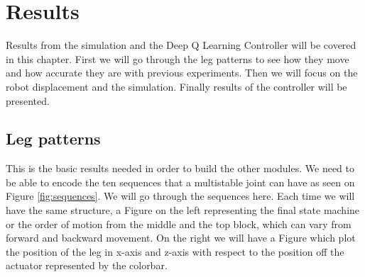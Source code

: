 \chapter{Results}
    Results from the simulation and the Deep Q Learning Controller will be covered in this chapter. First we will go through the leg patterns to see how they move and how accurate they are with previous experiments. Then we will focus on the robot displacement and the simulation. Finally results of the controller will be presented.
    
    \section{Leg patterns}\label{sec:res_legs}
        This is the basic results needed in order to build the other modules. We need to be able to encode the ten sequences that a multistable joint can have as seen on Figure \ref{fig:sequences}. We will go through the sequences here. Each time we will have the same structure, a Figure on the left representing the final state machine or the order of motion from the middle and the top block, which can vary from forward and backward movement. On the right we will have a Figure which plot the position of the leg in x-axis and z-axis with respect to the position off the actuator represented by the colorbar.
